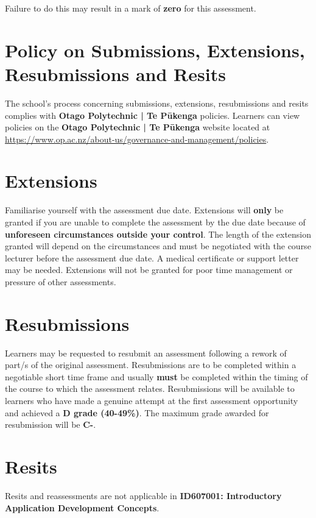 \documentclass{article}
\begin{document}
 Failure to do this may result in a mark of \textbf{zero} for this assessment.

\section*{Policy on Submissions, Extensions, Resubmissions and Resits}
The school's process concerning submissions, extensions, resubmissions and resits complies with \textbf{Otago Polytechnic | Te Pūkenga} policies. Learners can view policies on the \textbf{Otago Polytechnic | Te Pūkenga} website located at \href{https://www.op.ac.nz/about-us/governance-and-management/policies}{https://www.op.ac.nz/about-us/governance-and-management/policies}. 

\section*{Extensions}
Familiarise yourself with the assessment due date. Extensions will \textbf{only} be granted if you are unable to complete the assessment by the due date because of \textbf{unforeseen circumstances outside your control}. The length of the extension granted will depend on the circumstances and must be negotiated with the course lecturer before the assessment due date. A medical certificate or support letter may be needed. Extensions will not be granted for poor time management or pressure of other assessments.

\section*{Resubmissions}
Learners may be requested to resubmit an assessment following a rework of part/s of the original assessment. Resubmissions are to be completed within a negotiable short time frame and usually \textbf{must} be completed within the timing of the course to which the assessment relates. Resubmissions will be available to learners who have made a genuine attempt at the first assessment opportunity and achieved a \textbf{D grade (40-49\%)}. The maximum grade awarded for resubmission will be \textbf{C-}.

\section*{Resits}
Resits and reassessments are not applicable in \textbf{ID607001: Introductory Application Development Concepts}. 

\newpage
\end{document}
